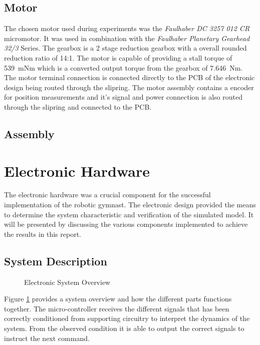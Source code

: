 \subsection{Motor}
The chosen motor used during experiments was the \textit{Faulhaber DC 3257 012 CR} micromotor. It was used in combination with the \textit{Faulhaber Planetary Gearhead 32/3} Series. The gearbox is a 2 stage reduction gearbox with a overall rounded reduction ratio of 14:1. The motor is capable of providing a stall torque of \SI{539}{mNm} which is a converted output torque from the gearbox of \SI{7.646}{Nm}.\\

The motor terminal connection is connected directly to the PCB of the electronic design being routed through the slipring. The motor assembly contains a encoder for position measurements and it's signal and power connection is also routed through the slipring and connected to the PCB.
\subsection{Assembly}



\section{Electronic Hardware}
The electronic hardware was a crucial component for the successful implementation of the robotic gymnast. The electronic design provided the means to determine the system characteristic and verification of the simulated model. It will be presented by discussing the various components implemented to achieve the results in this report.

\subsection{System Description}

\begin{figure}[h]
	\centering
	
	\caption{Electronic System Overview}
	\label{fig:electronicSystemOverview}
\end{figure}



Figure \ref{fig:electronicSystemOverview} provides a system overview and how the different parts functions together. The micro-controller receives the different signals that has been correctly conditioned from supporting circuitry to interpret the dynamics of the system. From the observed condition it is able to output the correct signals to instruct the next command.\\

